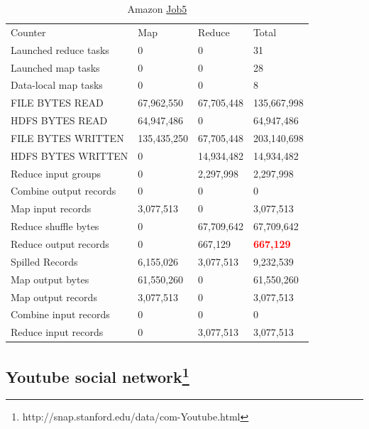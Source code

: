 \documentclass[paper=a4, fontsize=11pt]{scrartcl}	%
\numberwithin{equation}{section}															%
\numberwithin{figure}{section}																%
\numberwithin{table}{section}																%
\begin{document}
\begin{table}[!h]
	\centering
	\caption{Amazon \href{http://hadoop-compute0.di.univr.it:50030/jobdetails.jsp?jobid=job_201603141010_122300}{Job5}}
	\label{my-label}
	\begin{tabular}{llll}
		Counter&	Map&	Reduce&	Total\\
		Launched reduce tasks&	0&	0&	31\\
		Launched map tasks&	0&	0&	28\\
		Data-local map tasks&	0&	0&	8\\
		FILE BYTES READ&	67,962,550&	67,705,448&	135,667,998\\
		HDFS BYTES READ&	64,947,486&	0&	64,947,486\\
		FILE BYTES WRITTEN&	135,435,250&	67,705,448&	203,140,698\\
		HDFS BYTES WRITTEN&	0&	14,934,482&	14,934,482\\
		Reduce input groups&	0&	2,297,998&	2,297,998\\
		Combine output records&	0&	0&	0\\
		Map input records&	3,077,513&	0&	3,077,513\\
		Reduce shuffle bytes&	0&	67,709,642&	67,709,642\\
		Reduce output records&	0&	667,129&	\textbf{\textcolor{red}{667,129}}\\
		Spilled Records&	6,155,026&	3,077,513&	9,232,539\\
		Map output bytes&	61,550,260&	0&	61,550,260\\
		Map output records&	3,077,513&	0&	3,077,513\\
		Combine input records&	0&	0&	0\\
		Reduce input records&	0&	3,077,513&	3,077,513\\
	\end{tabular}
\end{table}
\FloatBarrier
\subsection{Youtube social network\protect\footnote{http://snap.stanford.edu/data/com-Youtube.html}} 
\end{document}
